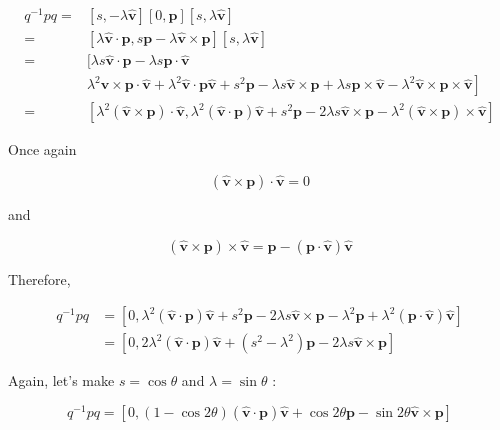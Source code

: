$$
\begin{aligned}
q^{-1} p q= & {[s,-\lambda \hat{\mathbf{v}}][0, \mathbf{p}][s, \lambda \hat{\mathbf{v}}] } \\
= & {[\lambda \hat{\mathbf{v}} \cdot \mathbf{p}, s \mathbf{p}-\lambda \hat{\mathbf{v}} \times \mathbf{p}][s, \lambda \hat{\mathbf{v}}] } \\
= & {[\lambda s \hat{\mathbf{v}} \cdot \mathbf{p}-\lambda s \mathbf{p} \cdot \hat{\mathbf{v}}} \\
& \left.\lambda^{2} \hat{\mathbf{v}} \times \mathbf{p} \cdot \hat{\mathbf{v}}+\lambda^{2} \hat{\mathbf{v}} \cdot \mathbf{p} \hat{\mathbf{v}}+s^{2} \mathbf{p}-\lambda s \hat{\mathbf{v}} \times \mathbf{p}+\lambda s \mathbf{p} \times \hat{\mathbf{v}}-\lambda^{2} \hat{\mathbf{v}} \times \mathbf{p} \times \hat{\mathbf{v}}\right] \\
= & {\left[\lambda^{2}(\hat{\mathbf{v}} \times \mathbf{p}) \cdot \hat{\mathbf{v}}, \lambda^{2}(\hat{\mathbf{v}} \cdot \mathbf{p}) \hat{\mathbf{v}}+s^{2} \mathbf{p}-2 \lambda s \hat{\mathbf{v}} \times \mathbf{p}-\lambda^{2}(\hat{\mathbf{v}} \times \mathbf{p}) \times \hat{\mathbf{v}}\right] }
\end{aligned}
$$

Once again

$$
(\hat{\mathbf{v}} \times \mathbf{p}) \cdot \hat{\mathbf{v}}=0
$$

and

$$
(\hat{\mathbf{v}} \times \mathbf{p}) \times \hat{\mathbf{v}}=\mathbf{p}-(\mathbf{p} \cdot \hat{\mathbf{v}}) \hat{\mathbf{v}}
$$

Therefore,

$$
\begin{aligned}
q^{-1} p q & =\left[0, \lambda^{2}(\hat{\mathbf{v}} \cdot \mathbf{p}) \hat{\mathbf{v}}+s^{2} \mathbf{p}-2 \lambda s \hat{\mathbf{v}} \times \mathbf{p}-\lambda^{2} \mathbf{p}+\lambda^{2}(\mathbf{p} \cdot \hat{\mathbf{v}}) \hat{\mathbf{v}}\right] \\
& =\left[0,2 \lambda^{2}(\hat{\mathbf{v}} \cdot \mathbf{p}) \hat{\mathbf{v}}+\left(s^{2}-\lambda^{2}\right) \mathbf{p}-2 \lambda s \hat{\mathbf{v}} \times \mathbf{p}\right]
\end{aligned}
$$

Again, let's make $s=\cos \theta$ and $\lambda=\sin \theta$ :

$$
q^{-1} p q=[0,(1-\cos 2 \theta)(\hat{\mathbf{v}} \cdot \mathbf{p}) \hat{\mathbf{v}}+\cos 2 \theta \mathbf{p}-\sin 2 \theta \hat{\mathbf{v}} \times \mathbf{p}]
$$

